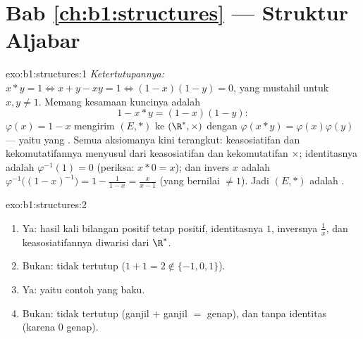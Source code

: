 \section*{Bab \ref{ch:b1:structures} --- Struktur Aljabar}

\begin{solution}{exo:b1:structures:1}
\emph{Ketertutupannya:} $x * y = 1 \iff x + y - xy = 1 \iff (1-x)(1-y) = 0$,
yang mustahil untuk $x, y \neq 1$. Memang kesamaan kuncinya adalah
\[
1 - x * y = (1 - x)(1 - y):
\]
 $\varphi(x) = 1 - x$ mengirim $(E, *)$ ke $(\R^*, \times)$ dengan
$\varphi(x * y) = \varphi(x)\varphi(y)$ --- yaitu  yang . Semua
aksiomanya kini terangkut: keasosiatifan dan kekomutatifannya menyusul dari
keasosiatifan dan kekomutatifan $\times$; identitasnya adalah $\varphi^{-1}(1) = 0$ (periksa: $x *
0 = x$); dan invers $x$ adalah $\varphi^{-1}\bigl((1-x)^{-1}\bigr) =
1 - \frac{1}{1-x} = \frac{x}{x - 1}$ (yang bernilai $\neq 1$). Jadi $(E, *)$
adalah .
\end{solution}

\begin{solution}{exo:b1:structures:2}
\begin{enumerate}
  \item Ya: hasil kali bilangan positif tetap positif, identitasnya $1$, inversnya
        $\frac 1x$, dan keasosiatifannya diwarisi dari $\R^*$.
  \item Bukan: tidak tertutup ($1 + 1 = 2 \notin \{-1,0,1\}$).
  \item Ya: yaitu contoh yang baku.
  \item Bukan: tidak tertutup (ganjil $+$ ganjil $=$ genap), dan tanpa identitas (karena $0$
        genap).
\end{enumerate}
\end{solution}

